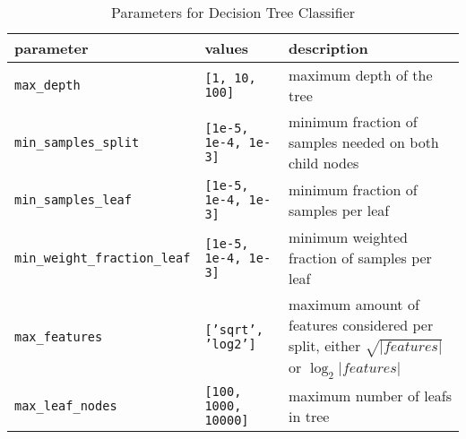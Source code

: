 \begin{table}[H]
	\caption{Parameters for Decision Tree Classifier}
	\label{TreeParams}
	\begin{tabularx}{\textwidth}{ l l X }
		parameter & values & description \\
		\hline
		\texttt{max\_depth} & \texttt{[1, 10, 100]} & maximum depth of the tree \\
		\texttt{min\_samples\_split} & \texttt{[1e-5, 1e-4, 1e-3]} & minimum fraction of samples needed on both child nodes \\
		\texttt{min\_samples\_leaf} & \texttt{[1e-5, 1e-4, 1e-3]} & minimum fraction of samples per leaf \\
		\texttt{min\_weight\_fraction\_leaf} & \texttt{[1e-5, 1e-4, 1e-3]} & minimum weighted fraction of samples per leaf \\
		\texttt{max\_features} & \texttt{['sqrt', 'log2']} & maximum amount of features considered per split, either $\sqrt{|features|}$ or $\log_2{|features|}$ \\
		\texttt{max\_leaf\_nodes} & \texttt{[100, 1000, 10000]} & maximum number of leafs in tree
	\end{tabularx}
\end{table}

